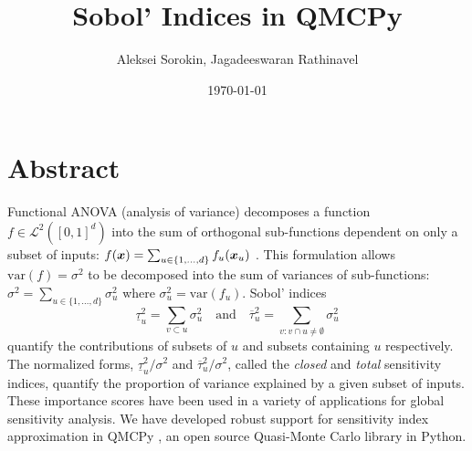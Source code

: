 \documentclass{article}
\title{Sobol' Indices in QMCPy}
\author{Aleksei Sorokin, Jagadeeswaran Rathinavel}
\date{\today}
\begin{document}
\maketitle

\section{Abstract}
Functional ANOVA (analysis of variance) decomposes a function $f \in \mathcal{L}^2([0,1]^d)$ into the sum of orthogonal sub-functions dependent on only a subset of inputs: $f(\boldsymbol{x}) = \sum_{u \in \{1,\dots,d\}} f_u(\boldsymbol{x}_u)$ \cite[Appendix A]{mcbook}. This formulation allows $\text{var}(f)=\sigma^2$ to be decomposed into the sum of variances of sub-functions: 
$\sigma^2 = \sum_{u \in \{1,\dots,d\}} \sigma^2_u$ where $\sigma^2_u = \text{var}(f_u)$. Sobol' indices 
$$\underline{\tau}_u^2 = \sum_{v \subset u} \sigma^2_u \quad \text{and} \quad  \overline{\tau}_u^2 = \sum_{v: v \cap u \neq \emptyset} \sigma^2_u$$ quantify the contributions of subsets of $u$ and subsets containing $u$ respectively. The normalized forms, $\underline{\tau}_u^2/\sigma^2$ and  $\overline{\tau}_u^2/\sigma^2$, called the \emph{closed} and \emph{total} sensitivity indices, quantify the proportion of variance explained by a given subset of inputs. These importance scores have been used in a variety of applications for global sensitivity analysis. We have developed robust support for sensitivity index approximation in QMCPy \cite{QMCPy}, an open source Quasi-Monte Carlo library in Python. 

\printbibliography
\end{document}
